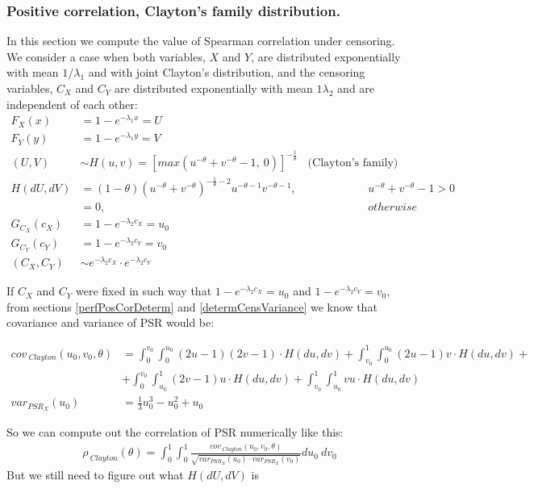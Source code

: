 \documentclass[]{article}
\begin{document}
\subsubsection{Positive correlation, Clayton's family distribution.}
In this section we compute the value of Spearman correlation under censoring. We consider a case when both variables, $X$ and $Y$, are distributed exponentially with mean $1/\lambda_1$ and with joint Clayton's distribution, and the censoring variables, $C_X$ and $C_Y$ are distributed exponentially with mean $1\lambda_2$ and are independent of each other:
	$$
	\begin{aligned}
    F_X(x) & = 1 - e^{-\lambda_1 x}= U\\
    F_Y(y) & = 1 - e^{-\lambda_1 y}= V\\
    (U,V) &\sim H(u, v) = \left[  max \left(  u^{-\theta} + v^{-\theta} - 1,~0  \right)  \right]^{-\frac{1}{\theta}}~~~~\text{(Clayton's family)}\\
    H(dU, dV) &= (1 - \theta) \left(  u^{-\theta} + v^{-\theta}  \right) ^{-\frac{1}{\theta} - 2} u^{-\theta - 1} v^{-\theta - 1},~~~~ & u^{-\theta} + v^{-\theta} - 1 >0\\
      &= 0, &{otherwise}\\   
    G_{C_X}(c_X) &= 1 - e^{- \lambda_2 c_X} = u_0\\
    G_{C_Y}(c_Y) &= 1 - e^{- \lambda_2 c_Y} = v_0\\
    (C_X,C_Y) &\sim e^{- \lambda_2 c_X} \cdot e^{- \lambda_2 c_Y}
	\end{aligned}
	$$

If $C_X$ and $C_Y$ were fixed in such way that $1 - e^{- \lambda_2 c_X} = u_0$ and $1 - e^{- \lambda_2 c_Y} = v_0$,  from sections \ref{perfPosCorDeterm} and \ref{determCensVariance} we know that covariance and variance of PSR would be:

	$$
	\begin{aligned}
    cov_{~Clayton}(u_0, v_0, \theta) &= \int_0^{v_0}\int_0^{u_0} (2u - 1)(2v - 1)\cdot H(du, dv) + \int_{v_0}^{1}\int_0^{u_0} (2u - 1)v\cdot H(du, dv) + \\
    &+\int_{0}^{v_0}\int_{u_0}^1 (2v - 1)u\cdot H(du, dv) + \int_{v_0}^{1}\int_{u_0}^1 vu\cdot H(du, dv)\\
    var_{PSR_X}(u_0)&= \frac{1}{3} u_0^3 - u_0^2 + u_0
	\end{aligned}
	$$

So we can compute out the correlation of PSR numerically like this:
	$$
  \begin{aligned}
      \rho_{~Clayton}(\theta) = \int_0^1\int_0^1  \frac{cov_{~Clayton}(u_0, v_0, \theta)}{\sqrt{var_{PSR_X}(u_0)\cdot var_{PSR_X}(v_0)}} du_0 ~dv_0
  \end{aligned}
	$$
But we still need to figure out what $H(dU, dV)$ is
\end{document}
